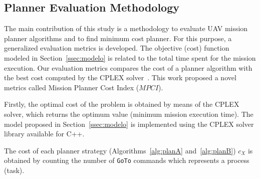 \documentclass[conference,harvard,brazil,english]{sbatex}
\begin{document}
%
%
%
\subsection{Planner Evaluation Methodology}
\label{ssec:evaluationmethod}

The main contribution of this study is a methodology to evaluate UAV mission planner algorithms and to find minimum cost planner. For this purpose, a generalized evaluation metrics is developed. The objective (cost) function modeled in Section~\ref{ssec:modelo} is related to the total time spent for the mission execution. Our evaluation metrics compares the cost of a planner algorithm with the best cost computed by the CPLEX solver~\cite{cplex2003ilog}. This work proposed a novel metrics called Mission Planner Cost Index ($MPCI$).

Firstly, the optimal cost of the problem is obtained by means of the CPLEX solver, which returns the optimum value (minimum mission execution time). The model proposed in Section~\ref{ssec:modelo} is implemented using the CPLEX solver library available for C++. 

The cost of each planner strategy (Algorithms~\ref{alg:planA} and~\ref{alg:planB}) $c_X$ is obtained by counting the number of \texttt{GoTo} commands which represents a process (task).
\end{document}
